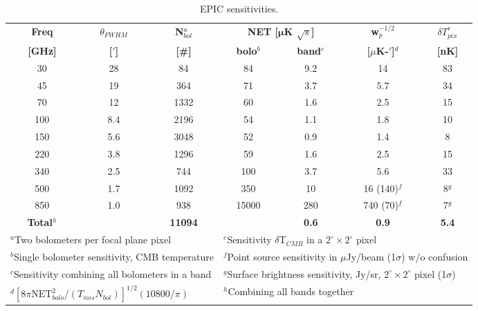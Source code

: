 \begin{table}[h]
\centering
\begin{tabular}{|c|c|c|c|c|c|c|}
\hline
{\bf Freq} & { $\theta_{FWHM}$} & {\bf N$_{bol}^a$} & \multicolumn{2}{|c|}{\bf NET [$\pmb\mu$K $\sqrt{s}$]} & {\bf w$_p^{-1/2}$} & {\bf $\delta T_{pix}^e$ } \\ \cline{4-5}
{\bf [GHz]} & {\bf [$'$]} & {\bf [\#]} & {\bf bolo$^b$} & {\bf band$^c$} & {\bf [$\mu$K-$'$]$^d$} & {\bf [nK]} \\ \hline
30  & 28  & 84   & 84  & 9.2 & 14 & 83 \\ \hline
45  & 19  & 364  & 71  & 3.7 & 5.7 & 34 \\ \hline
70  & 12  & 1332 & 60  & 1.6 & 2.5 & 15 \\ \hline
100 & 8.4 & 2196 & 54  & 1.1 & 1.8 & 10 \\ \hline
150 & 5.6 & 3048 & 52  & 0.9 & 1.4 & 8  \\ \hline
220 & 3.8 & 1296 & 59  & 1.6 & 2.5 & 15 \\ \hline
340 & 2.5 & 744  & 100  & 3.7 & 5.6 & 33 \\ \hline
500 & 1.7 & 1092 & 350  & 10  & 16 (140)$^f$ & 8$^g$ \\ \hline
850 & 1.0 & 938  & 15000  & 280 & 740 (70)$^f$ & 7$^g$ \\ \hline
{\bf Total$^h$} & & {\bf 11094} & & {\bf 0.6} & {\bf 0.9} & {\bf 5.4} \\
\hline
\multicolumn{3}{|l}{\footnotesize$^a$Two bolometers per focal plane pixel} & \multicolumn{4}{l|}{\footnotesize$^e$Sensitivity $\delta$T$_{CMB}$ in a $2^{\circ} \times 2^{\circ}$ pixel} \\
\multicolumn{3}{|l}{\footnotesize$^b$Single bolometer sensitivity, CMB temperature} & \multicolumn{4}{l|}{\footnotesize$^f$Point source sensitivity in $\mu$Jy/beam (1$\sigma$) w/o confusion} \\
\multicolumn{3}{|l}{\footnotesize$^c$Sensitivity combining all bolometers in a band} & \multicolumn{4}{l|}{\footnotesize$^g$Surface brightness sensitivity, Jy/sr, $2^{\circ} \times 2^{\circ}$ pixel (1$\sigma$) } \\
\multicolumn{3}{|l}{\footnotesize$^d[8\pi \mbox{NET}_{bolo}^2 / (T_{mis}N_{bol})]^{1/2}(10800/\pi)$} & \multicolumn{4}{l|}{\footnotesize$^h$Combining all bands together} \\
\hline
\end{tabular}
\vspace{-0.13in}
\caption{ \small \setlength{\baselineskip}{0.96\baselineskip}
EPIC sensitivities. 
\label{tab:epic} }
\normalsize
\vspace{-0.05in}
\end{table}


